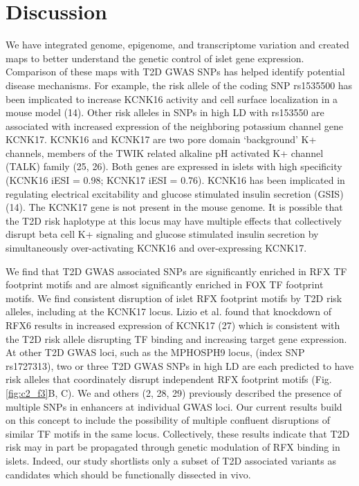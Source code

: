 \section{Discussion}
We have integrated genome, epigenome, and transcriptome variation and created maps to better understand the genetic control of islet gene expression. Comparison of these maps with T2D GWAS SNPs has helped identify potential disease mechanisms. For example, the risk allele of the coding SNP rs1535500 has been implicated to increase KCNK16 activity and cell surface localization in a mouse model (14). Other risk alleles in SNPs in high LD with rs153550 are associated with increased expression of the neighboring potassium channel gene KCNK17. KCNK16 and KCNK17 are two pore domain ‘background’ K+ channels, members of the TWIK related alkaline pH activated K+ channel (TALK) family (25, 26). Both genes are expressed in islets with high specificity (KCNK16 iESI = 0.98; KCNK17 iESI = 0.76). KCNK16 has been implicated in regulating electrical excitability and glucose stimulated insulin secretion (GSIS) (14). The KCNK17 gene is not present in the mouse genome. It is possible that the T2D risk haplotype at this locus may have multiple effects that collectively disrupt beta cell K+ signaling and glucose stimulated insulin secretion by simultaneously over-activating KCNK16 and over-expressing KCNK17.

We find that T2D GWAS associated SNPs are significantly enriched in RFX TF footprint motifs and are almost significantly enriched in FOX TF footprint motifs. We find consistent disruption of islet RFX footprint motifs by T2D risk alleles, including at the KCNK17 locus. Lizio et al. found that knockdown of RFX6 results in increased expression of KCNK17 (27) which is consistent with the T2D risk allele disrupting TF binding and increasing target gene expression. At other T2D GWAS loci, such as the MPHOSPH9 locus, (index SNP rs1727313), two or three T2D GWAS SNPs in high LD are each predicted to have risk alleles that coordinately disrupt independent RFX footprint motifs (Fig. \ref{fig:c2_f3}B, C).  We and others (2, 28, 29) previously described the presence of multiple SNPs in enhancers at individual GWAS loci. Our current results build on this concept to include the possibility of multiple confluent disruptions of similar TF motifs in the same locus. Collectively, these results indicate that T2D risk may in part be propagated through genetic modulation of RFX binding in islets. Indeed, our study shortlists only a subset of T2D associated variants as candidates which should be functionally dissected in vivo.

